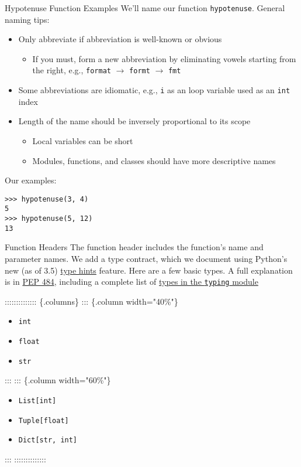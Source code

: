 \documentclass[smaller, aspectratio=1610]{beamer}
\begin{document}
\begin{frame}[label={sec:orgaf3f74c},fragile]{Hypotenuse Function Examples}
 We'll name our function \texttt{hypotenuse}. General naming tips:

\begin{itemize}
\item Only abbreviate if abbreviation is well-known or obvious
\begin{itemize}
\item If you must, form a new abbreviation by eliminating vowels starting from the right, e.g., \texttt{format} \(\rightarrow\) \texttt{formt} \(\rightarrow\) \texttt{fmt}
\end{itemize}
\item Some abbreviations are idiomatic, e.g., \texttt{i} as an loop variable used as an \texttt{int} index
\item Length of the name should be inversely proportional to its scope
\begin{itemize}
\item Local variables can be short
\item Modules, functions, and classes should have more descriptive names
\end{itemize}
\end{itemize}

Our examples:
\lstset{language=Python,label= ,caption= ,captionpos=b,numbers=none}
\begin{lstlisting}
>>> hypotenuse(3, 4)
5
>>> hypotenuse(5, 12)
13
\end{lstlisting}
\end{frame}

\begin{frame}[label={sec:org92eec83},fragile]{Function Headers}
 The function header includes the function's name and parameter names.  We add a \alert{type contract}, which we document using Python's new (as of 3.5) \href{https://docs.python.org/3/library/typing.html}{type hints} feature.  Here are a few basic types.  A full explanation is in \href{https://www.python.org/dev/peps/pep-0484}{PEP 484}, including a complete list of \href{https://www.python.org/dev/peps/pep-0484/\#the-typing-module}{types in the \texttt{typing} module}

:::::::::::::: \{.columns\}
::: \{.column width="40\%"\}
\begin{itemize}
\item \texttt{int}
\item \texttt{float}
\item \texttt{str}
\end{itemize}
:::
::: \{.column width="60\%"\}
\begin{itemize}
\item \texttt{List[int]}
\item \texttt{Tuple[float]}
\item \texttt{Dict[str, int]}
\end{itemize}
:::
::::::::::::::
\end{frame}
\end{document}
